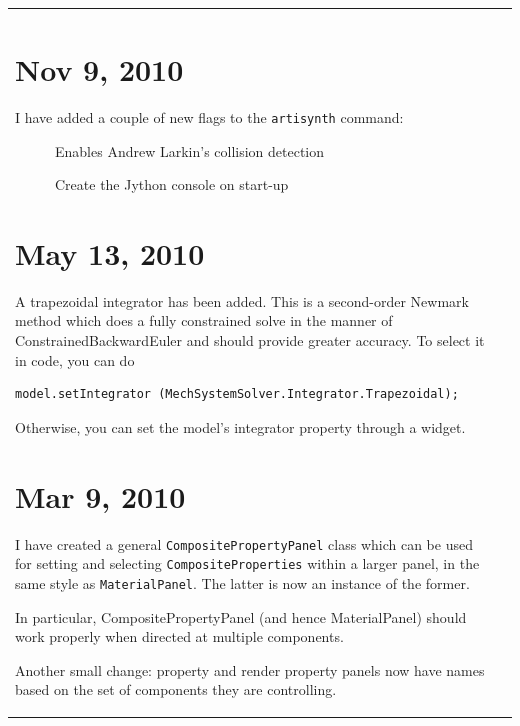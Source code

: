 \documentclass{article}
\begin{document}
\begin{tabular}{ll}
\section*{Nov 9, 2010}

I have added a couple of new flags to the {\tt artisynth} command:

\begin{description}

\item[{\tt -useAjlCollision}] \mbox{}

 Enables Andrew Larkin's collision detection

\item[{\tt -showJythonConsole}] \mbox{}

 Create the Jython console on start-up

\end{description}

\section*{May 13, 2010}

A trapezoidal integrator has been added. This is a second-order
Newmark method which does a fully constrained solve in the manner of
ConstrainedBackwardEuler and should provide greater accuracy. To
select it in code, you can do

\begin{lstlisting}[]
model.setIntegrator (MechSystemSolver.Integrator.Trapezoidal);
\end{lstlisting}

Otherwise, you can set the model's integrator property through a
widget.

\section*{Mar 9, 2010}

I have created a general {\tt CompositePropertyPanel} class which can be
used for setting and selecting {\tt CompositeProperties} within a larger
panel, in the same style as {\tt MaterialPanel}. The latter is now an
instance of the former.

In particular, CompositePropertyPanel (and hence MaterialPanel) should
work properly when directed at multiple components.

Another small change: property and render property panels now have
names based on the set of components they are controlling.


\end{tabular}
\end{document}
